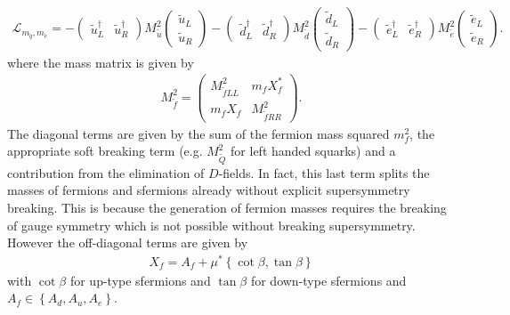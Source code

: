 \begin{align}
\mathcal{L}_{m_{\tilde{q}},m_{\tilde{e}}} = - \begin{pmatrix}
\tilde{u}^\dagger_L & \tilde{u}^\dagger_R 
\end{pmatrix} M^2_{\tilde{u}} \begin{pmatrix}
\tilde{u}_L \\
\tilde{u}_R 
\end{pmatrix} - \begin{pmatrix}
\tilde{d}^\dagger_L & \tilde{d}^\dagger_R 
\end{pmatrix} M^2_{\tilde{d}} \begin{pmatrix}
\tilde{d}_L \\
\tilde{d}_R 
\end{pmatrix} - \begin{pmatrix}
\tilde{e}^\dagger_L & \tilde{e}^\dagger_R 
\end{pmatrix} M^2_{\tilde{e}} \begin{pmatrix}
\tilde{e}_L \\
\tilde{e}_R 
\end{pmatrix}.
\end{align}
where the mass matrix is given by 
\begin{align}
M^2_{\tilde{f}} = \begin{pmatrix}
M^2_{\tilde{f}LL} & m_f X_f^\ast \\
m_f X_f &  M^2_{\tilde{f}RR}
\end{pmatrix}.
\end{align}
The diagonal terms are given by the sum of the fermion mass squared $m_f^2$, the appropriate soft breaking term (e.g. $M_{\tilde{Q}}^2$ for left handed squarks) and a contribution from the elimination of $D$-fields. In fact, this last term splits the masses of fermions and sfermions already without explicit supersymmetry breaking. This is because the generation of fermion masses requires the breaking of gauge symmetry which is not possible without breaking supersymmetry. However the off-diagonal terms are given by
\begin{align}
X_f = A_f + \mu^\ast\left\{ \cot \beta, \tan \beta \right\} \label{eq:off_diagonal}
\end{align}
with $\cot \beta$ for up-type sfermions and $\tan \beta$ for down-type sfermions and $A_f \in \left\{ A_d, A_u, A_e \right\}$.

